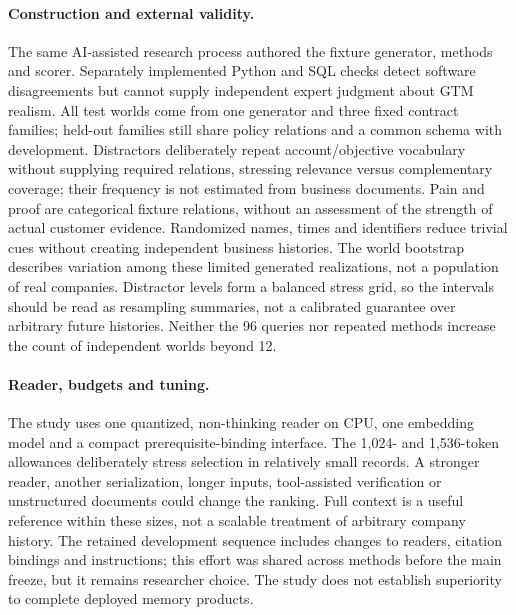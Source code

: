 \paragraph{Construction and external validity.}
The same AI-assisted research process authored the fixture generator, methods and scorer. Separately implemented Python and SQL checks detect software disagreements but cannot supply independent expert judgment about GTM realism. All test worlds come from one generator and three fixed contract families; held-out families still share policy relations and a common schema with development. Distractors deliberately repeat account/objective vocabulary without supplying required relations, stressing relevance versus complementary coverage; their frequency is not estimated from business documents. Pain and proof are categorical fixture relations, without an assessment of the strength of actual customer evidence. Randomized names, times and identifiers reduce trivial cues without creating independent business histories. The world bootstrap describes variation among these limited generated realizations, not a population of real companies. Distractor levels form a balanced stress grid, so the intervals should be read as resampling summaries, not a calibrated guarantee over arbitrary future histories. Neither the 96 queries nor repeated methods increase the count of independent worlds beyond 12.

\paragraph{Reader, budgets and tuning.}
The study uses one quantized, non-thinking reader on CPU, one embedding model and a compact prerequisite-binding interface. The 1,024- and 1,536-token allowances deliberately stress selection in relatively small records. A stronger reader, another serialization, longer inputs, tool-assisted verification or unstructured documents could change the ranking. Full context is a useful reference within these sizes, not a scalable treatment of arbitrary company history. The retained development sequence includes changes to readers, citation bindings and instructions; this effort was shared across methods before the main freeze, but it remains researcher choice. The study does not establish superiority to complete deployed memory products.

